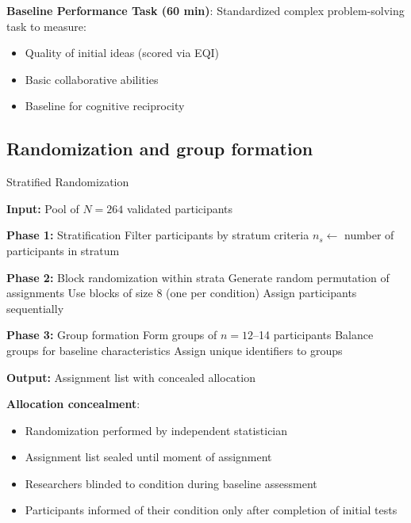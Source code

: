 \textbf{Baseline Performance Task (60 min)}:
Standardized complex problem-solving task to measure:
\begin{itemize}
    \item Quality of initial ideas (scored via EQI)
    \item Basic collaborative abilities
    \item Baseline for cognitive reciprocity
\end{itemize}

\subsection{Randomization and group formation}

\begin{algorithm}[H]
\caption{Stratified Randomization}
\label{alg:randomization}
\begin{algorithmic}[1]
\State \textbf{Input:} Pool of $N=264$ validated participants

\State \textbf{Phase 1:} Stratification
    \State Filter participants by stratum criteria
    \State $n_s \gets$ number of participants in stratum
\EndFor

\State \textbf{Phase 2:} Block randomization within strata
    \State Generate random permutation of assignments
    \State Use blocks of size 8 (one per condition)
    \State Assign participants sequentially
\EndFor

\State \textbf{Phase 3:} Group formation
    \State Form groups of $n=12$--14 participants
    \State Balance groups for baseline characteristics
    \State Assign unique identifiers to groups
\EndFor

\State \textbf{Output:} Assignment list with concealed allocation
\end{algorithmic}
\end{algorithm}

\newpage

\textbf{Allocation concealment}:
\begin{itemize}
    \item Randomization performed by independent statistician
    \item Assignment list sealed until moment of assignment
    \item Researchers blinded to condition during baseline assessment
    \item Participants informed of their condition only after completion of initial tests
\end{itemize}

